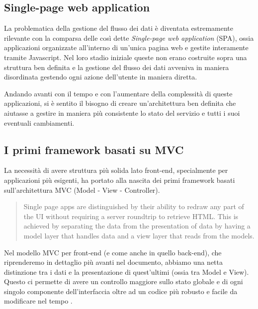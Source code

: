 \subsection{Single-page web application}
La problematica della gestione del flusso dei dati è diventata estremamente rilevante con la comparsa delle così dette \textit{Single-page web application} (SPA), ossia applicazioni organizzate all'interno di un'unica pagina web e gestite interamente tramite Javascript.
Nel loro stadio iniziale queste non erano costruite sopra una struttura ben definita e la gestione del flusso dei dati avveniva in maniera disordinata gestendo ogni azione dell'utente in maniera diretta.

Andando avanti con il tempo e con l'aumentare della complessità di queste applicazioni, si è sentito il bisogno di creare un'architettura ben definita che aiutasse a gestire in maniera più consistente lo stato del servizio e tutti i suoi eventuali cambiamenti.

\subsection{I primi framework basati su MVC}
La necessità di avere struttura più solida lato front-end, specialmente per applicazioni più esigenti, ha portato alla nascita dei primi framework basati sull'architettura MVC (Model - View - Controller).

\blockquote{Single page apps are distinguished by their ability to redraw any part of the UI without requiring a server roundtrip to retrieve HTML. This is achieved by separating the data from the presentation of data by having a model layer that handles data and a view layer that reads from the models. \cite{MixuSinglePageWebApp}}

\noindent Nel modello MVC per front-end (e come anche in quello back-end), che riprenderemo in dettaglio più avanti nel documento, abbiamo una netta distinzione tra i dati e la presentazione di quest'ultimi (ossia tra Model e View). Questo ci permette di avere un controllo maggiore sullo stato globale e di ogni singolo componente dell'interfaccia oltre ad un codice più robusto e facile da modificare nel tempo \cite{ParrOnTheMVC}.

